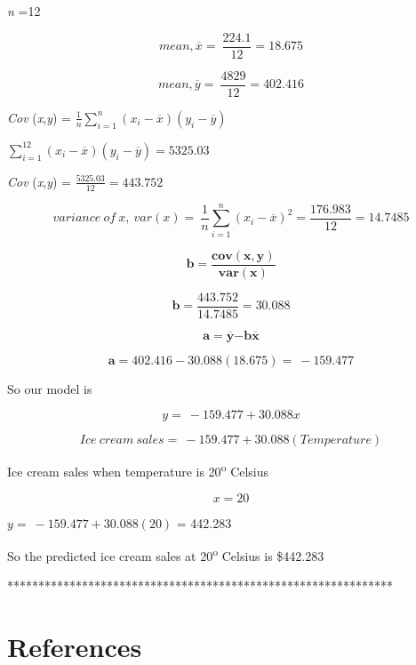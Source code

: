 \documentclass[
]{book}
\begin{document}
\emph{n} =12

\[mean,\overline{x} = \ \frac{224.1}{12} = 18.675\]

\[mean,\overline{y} = \ \frac{4829}{12} = 402.416\]

\emph{Cov} (\emph{x},\emph{y}) =
\(\frac{1}{n}\sum_{i = 1}^{n}{\left( x_{i} - \overline{x} \right)\left( y_{i} - \overline{y} \right)}\)

\(\sum_{i = 1}^{12}{\left( x_{i} - \overline{x} \right)\left( y_{i} - \overline{y} \right)} = 5325.03\)

\emph{Cov} (\emph{x},\emph{y}) = \(\frac{5325.03}{12} = 443.752\)

\[variance\ of\ x,\ var\left( x \right) = \ \frac{1}{n}\sum_{i = 1}^{n}\left( x_{i} - \overline{x} \right)^{2} = \frac{176.983}{12} = 14.7485\]

\[\mathbf{b =}\frac{\mathbf{cov(x,y)}}{\mathbf{var(x)}}\]

\[\mathbf{b =}\frac{443.752}{14.7485}\mathbf{=}30.088\]

\[\mathbf{a =}\overline{\mathbf{y}}\mathbf{- b}\overline{\mathbf{x}}\]

\[\mathbf{a =}402.416 - 30.088\left( 18.675 \right) = \  - 159.477\]

So our model is

\[y = \  - 159.477 + 30.088x\]

\[Ice\ cream\ sales = \  - 159.477 + 30.088(Temperature)\]

Ice cream sales when temperature is 20\textsuperscript{o} Celsius

\[x = 20\]

\(y = \  - 159.477 + 30.088(20)\) = 442.283

So the predicted ice cream sales at 20\textsuperscript{o} Celsius is \$442.283

**************************************************************

\hypertarget{references}{%
\chapter{References}\label{references}}

  
\end{document}
